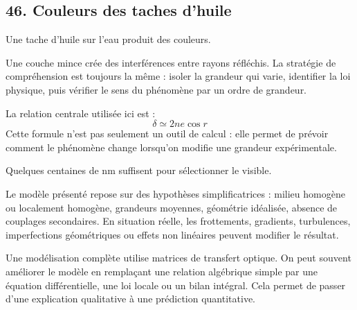 \documentclass[11pt,a4paper]{article}
\begin{document}
\subsection{46. Couleurs des taches d'huile}

\begin{exemplebox}
Une tache d'huile sur l'eau produit des couleurs.
\end{exemplebox}

\begin{methodebox}
Une couche mince crée des interférences entre rayons réfléchis.
La stratégie de compréhension est toujours la même : isoler la grandeur qui varie, identifier la loi physique, puis vérifier le sens du phénomène par un ordre de grandeur.
\end{methodebox}

\begin{theorembox}
La relation centrale utilisée ici est :
\[
\delta\simeq2ne\cos r
\]
Cette formule n'est pas seulement un outil de calcul : elle permet de prévoir comment le phénomène change lorsqu'on modifie une grandeur expérimentale.
\end{theorembox}

\begin{odgbox}
Quelques centaines de nm suffisent pour sélectionner le visible.
\end{odgbox}

\begin{attentionbox}
Le modèle présenté repose sur des hypothèses simplificatrices : milieu homogène ou localement homogène, grandeurs moyennes, géométrie idéalisée, absence de couplages secondaires. En situation réelle, les frottements, gradients, turbulences, imperfections géométriques ou effets non linéaires peuvent modifier le résultat.
\end{attentionbox}

\begin{approfondissementbox}
Une modélisation complète utilise matrices de transfert optique.
On peut souvent améliorer le modèle en remplaçant une relation algébrique simple par une équation différentielle, une loi locale ou un bilan intégral. Cela permet de passer d'une explication qualitative à une prédiction quantitative.
\end{approfondissementbox}
\end{document}
